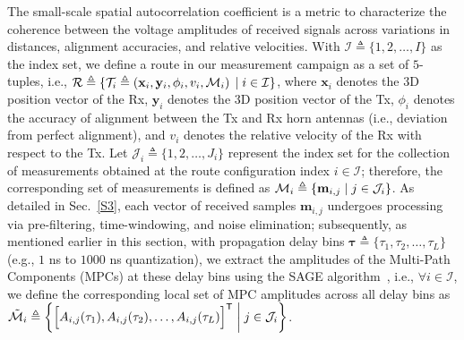 \documentclass[12pt, draftcls, onecolumn]{IEEEtran}
\newcommand{\suchthat}{\;\ifnum\currentgrouptype=16 \middle\fi|\;}
\begin{document}
{The small-scale spatial autocorrelation coefficient is a metric to characterize the coherence between the voltage amplitudes of received signals across variations in distances, alignment accuracies, and relative velocities. With $\mathcal{I} \triangleq \{1,2,{\dots},I\}$ as the index set, we define a route in our measurement campaign as a set of $5$-tuples, i.e., $\mathcal{R} \triangleq \{\mathcal{T}_{i} \triangleq \left(\mathbf{x}_{i}, \mathbf{y}_{i}, \phi_{i}, v_{i}, \mathcal{M}_{i}\right) \suchthat i \in \mathcal{I}\}$, where $\mathbf{x}_{i}$ denotes the $3$D position vector of the Rx, $\mathbf{y}_{i}$ denotes the $3$D position vector of the Tx, $\phi_{i}$ denotes the accuracy of alignment between the Tx and Rx horn antennas (i.e., deviation from perfect alignment), and $v_{i}$ denotes the relative velocity of the Rx with respect to the Tx. Let $\mathcal{J}_{i} \triangleq \{1,2,{\dots},J_{i}\}$ represent the index set for the collection of measurements obtained at the route configuration index $i \in \mathcal{I}$; therefore, the corresponding set of measurements is defined as $\mathcal{M}_{i} \triangleq \{\mathbf{m}_{i,j} \suchthat j \in \mathcal{J}_{i}\}$. As detailed in Sec.~\ref{S3}, each vector of received samples $\mathbf{m}_{i,j}$ undergoes processing via pre-filtering, time-windowing, and noise elimination; subsequently, as mentioned earlier in this section, with propagation delay bins $\boldsymbol{\tau} \triangleq \{\tau_{1},\tau_{2},{\dots},\tau_{L}\}$ (e.g., $1$ ns to $1000$ ns quantization), we extract the amplitudes of the Multi-Path Components (MPCs) at these delay bins using the SAGE algorithm~\cite{SAGE}, i.e., $\forall i \in \mathcal{I}$, we define the corresponding local set of MPC amplitudes across all delay bins as $\tilde{\mathcal{M}}_{i} \triangleq \left\{\Big[A_{i,j}(\tau_{1}), A_{i,j}(\tau_{2}), \dots, A_{i,j}(\tau_{L})\Big]^{\mathsf{T}} \suchthat j \in \mathcal{J}_{i}\right\}$.

}
\end{document}
